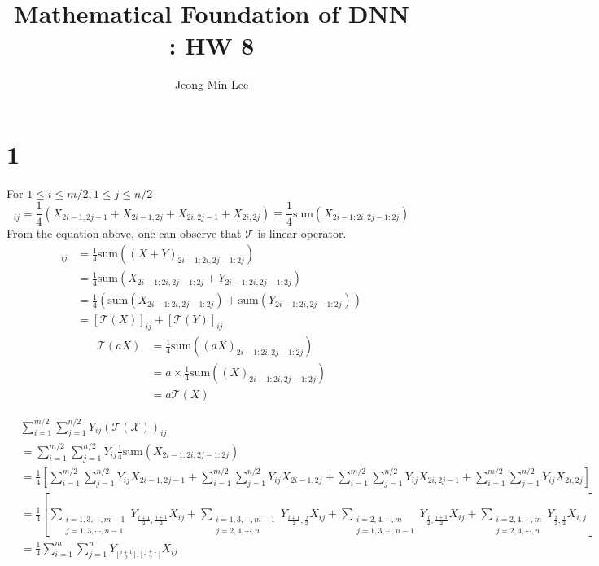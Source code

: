 \documentclass[10pt]{article}
\title{\textbf{Mathematical Foundation of DNN : HW 8}}
\author{Jeong Min Lee}
\begin{document}
\maketitle

\section*{1}
For $1\le i \le m/2, 1\le j \le n/2$
\begin{equation*}
    [\mathcal{T}(X)]_{ij} = \frac{1}{4}\left(X_{2i-1,2j-1} + X_{2i-1,2j} + X_{2i,2j-1} + X_{2i,2j}\right) \equiv \frac{1}{4}\text{sum}\left(X_{2i-1:2i,2j-1:2j}\right)
\end{equation*}
From the equation above, one can observe that $\mathcal{T}$ is linear operator.
\begin{align*}
    [\mathcal{T}(X+Y)]_{ij} &= \frac{1}{4}\text{sum}\left(\left(X+Y\right)_{2i-1:2i, 2j-1:2j}\right) \\
    &= \frac{1}{4}\text{sum}\left(X_{2i-1:2i, 2j-1:2j} + Y_{2i-1:2i, 2j-1:2j}\right)\\
    &= \frac{1}{4}\left(\text{sum}(X_{{2i-1:2i, 2j-1:2j}}) + \text{sum}(Y_{{2i-1:2i, 2j-1:2j}})\right) \\
    &= \left[\mathcal{T}(X)\right]_{ij} + \left[\mathcal{T}(Y)\right]_{ij}
\end{align*}
\begin{align*}
    \mathcal{T}(aX) &= \frac{1}{4}\text{sum}\left((aX)_{2i-1:2i, 2j-1:2j}\right) \\
    &= a\times \frac{1}{4}\text{sum}\left((X)_{2i-1:2i, 2j-1:2j}\right) \\
    &= a\mathcal{T}(X)
\end{align*}


\begin{align*}
    &\sum_{i=1}^{m/2}\sum_{j=1}^{n/2}Y_{ij}(\mathcal{T(X)})_{ij}\\
    & = \sum_{i=1}^{m/2}\sum_{j=1}^{n/2}Y_{ij}\frac{1}{4}\text{sum}\left(X_{2i-1:2i, 2j-1:2j}\right)\\ 
    &= \frac{1}{4}\left[\sum_{i=1}^{m/2}\sum_{j=1}^{n/2} Y_{ij}X_{2i-1,2j-1} + \sum_{i=1}^{m/2}\sum_{j=1}^{n/2} Y_{ij}X_{2i-1,2j} + \sum_{i=1}^{m/2}\sum_{j=1}^{n/2} Y_{ij}X_{2i,2j-1} + \sum_{i=1}^{m/2}\sum_{j=1}^{n/2} Y_{ij}X_{2i,2j}\right] \\
    &= \frac{1}{4}\left[\sum_{\substack{i=1,3,\cdots,m-1 \\ j = 1,3, \cdots, n-1}} Y_{\frac{i+1}{2},\frac{j+1}{2}}X_{ij} + \sum_{\substack{i=1,3,\cdots,m-1 \\ j = 2,4, \cdots, n}} Y_{\frac{i+1}{2},\frac{j}{2}}X_{ij} + \sum_{\substack{i=2,4,\cdots,m \\ j = 1,3, \cdots, n-1}} Y_{\frac{i}{2},\frac{j+1}{2}}X_{ij} + \sum_{\substack{i=2,4,\cdots,m \\ j = 2,4, \cdots, n}} Y_{\frac{i}{2},\frac{j}{2}}X_{i,j}\right] \\
    &=\frac{1}{4}\sum_{i=1}^m\sum_{j=1}^n Y_{\lfloor\frac{i+1}{2}\rfloor, \lfloor \frac{j+1}{2}\rfloor} X_{ij}
\end{align*}
\end{document}
